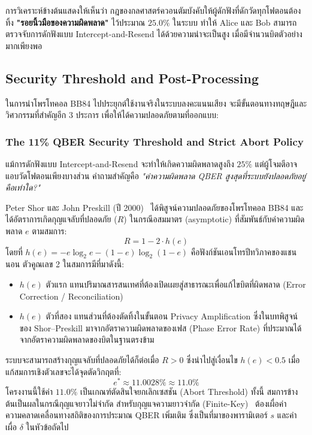 การวิเคราะห์ข้างต้นแสดงให้เห็นว่า กฎของกลศาสตร์ควอนตัมบังคับให้ผู้ดักฟังที่ดักวัดทุกโฟตอนต้องทิ้ง \textbf{"รอยนิ้วมือของความผิดพลาด"} ไว้ประมาณ $25.0\%$ ในระบบ ทำให้ Alice และ Bob สามารถตรวจจับการดักฟังแบบ Intercept-and-Resend ได้ด้วยความน่าจะเป็นสูง เมื่อมีจำนวนบิตตัวอย่างมากเพียงพอ

\subsection{Security Threshold and Post-Processing}
ในการนำโพรโทคอล BB84 ไปประยุกต์ใช้งานจริงในระบบลงคะแนนเสียง จะมีขั้นตอนทางทฤษฎีและวิศวกรรมที่สำคัญอีก 3 ประการ เพื่อให้ได้ความปลอดภัยตามที่ออกแบบ:

\subsubsection{The 11\% QBER Security Threshold and Strict Abort Policy}
แม้การดักฟังแบบ Intercept-and-Resend จะทำให้เกิดความผิดพลาดสูงถึง $25\%$ แต่ผู้โจมตีอาจแอบวัดโฟตอนเพียงบางส่วน คำถามสำคัญคือ \textit{"ค่าความผิดพลาด QBER สูงสุดที่ระบบยังปลอดภัยอยู่คือเท่าใด?"}

Peter Shor และ John Preskill (ปี 2000)~\cite{shor_preskill_2000} ได้พิสูจน์ความปลอดภัยของโพรโทคอล BB84 และได้อัตราการเกิดกุญแจลับที่ปลอดภัย ($R$) ในกรณีอสมมาตร (asymptotic) ที่สัมพันธ์กับค่าความผิดพลาด $e$ ตามสมการ:
\begin{equation}
    R = 1 - 2 \cdot h(e)
\end{equation}
โดยที่ $h(e) = -e \log_2 e - (1-e) \log_2(1-e)$ คือฟังก์ชันเอนโทรปีทวิภาคของแชนนอน ตัวคูณเลข 2 ในสมการมีที่มาดังนี้:
\begin{itemize}
    \item $h(e)$ ตัวแรก แทนปริมาณสารสนเทศที่ต้องเปิดเผยสู่สาธารณะเพื่อแก้ไขบิตที่ผิดพลาด (Error Correction / Reconciliation)
    \item $h(e)$ ตัวที่สอง แทนส่วนที่ต้องตัดทิ้งในขั้นตอน Privacy Amplification ซึ่งในบทพิสูจน์ของ Shor--Preskill มาจากอัตราความผิดพลาดของเฟส (Phase Error Rate) ที่ประมาณได้จากอัตราความผิดพลาดของบิตในฐานตรงข้าม
\end{itemize}
ระบบจะสามารถสร้างกุญแจลับที่ปลอดภัยได้ก็ต่อเมื่อ $R > 0$ ซึ่งนำไปสู่เงื่อนไข $h(e) < 0.5$ เมื่อแก้สมการเชิงตัวเลขจะได้จุดตัดวิกฤตที่:
\begin{equation}
    e^* \approx \mathbf{11.0028\% \approx 11.0\%}
\end{equation}
โครงงานนี้ใช้ค่า $11.0\%$ เป็นเกณฑ์ตัดสินใจยกเลิกเซสชัน (Abort Threshold) ทั้งนี้ สมการข้างต้นเป็นผลในกรณีกุญแจยาวไม่จำกัด สำหรับกุญแจความยาวจำกัด (Finite-Key)~\cite{tomamichel_finite_key_2012, renner_security_qkd} ต้องเผื่อค่าความคลาดเคลื่อนทางสถิติของการประมาณ QBER เพิ่มเติม ซึ่งเป็นที่มาของพารามิเตอร์ $s$ และค่าเผื่อ $\delta$ ในหัวข้อถัดไป

